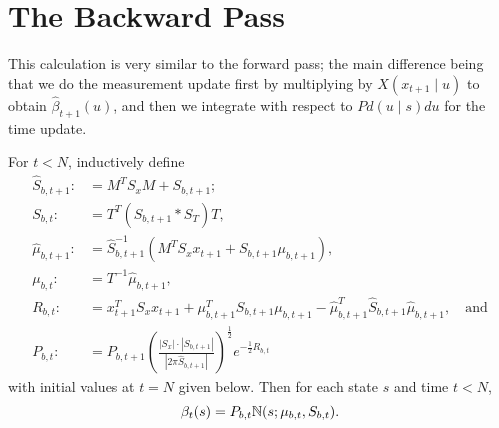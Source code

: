 \documentclass[12pt,leqno]{article}
\begin{document}
\section{The Backward Pass}
This calculation is very similar to the forward pass; the main difference being that we do
the measurement update first by multiplying by $X(x_{t+1}\mid u)$ to obtain $\hat{\beta}_{t+1}(u)$,
and then we integrate with respect to $Pd(u\mid s)du$ for the time update.  

\begin{Thm}\label{beta:1}
  For $t < N$, inductively define
\begin{align*}
  \hat{S}_{b,t+1} :&= M^TS_xM + S_{b,t+1};\\
  S_{b,t} :&= T^T(\hat{S}_{b,t+1}*S_T)T,\\
  \hat{\mu}_{b,t+1} :&= \hat{S}_{b,t+1}^{-1}(M^TS_xx_{t+1} + S_{b,t+1}\mu_{b,t+1}),\\
  \mu_{b,t} :&= T^{-1}\hat{\mu}_{b,t+1},\\
  R_{b,t} :&= x_{t+1}^TS_xx_{t+1} + \mu_{b,t+1}^TS_{b,t+1}\mu_{b,t+1} - \hat{\mu}_{b,t+1}^T\hat{S}_{b,t+1}\hat{\mu}_{b,t+1},\quad\text{and}\\
  P_{b,t} :&= P_{b,t+1}\left(\frac{|S_x|\cdot|S_{b,t+1}|}{|2\pi\hat{S}_{b,t+1}|}\right)^{\frac{1}{2}}e^{-\frac{1}{2}R_{b,t}}
\end{align*}
with initial values at $t = N$ given below. Then for each state $s$ and time $t < N$,
$$
  \beta_t(s) = P_{b,t}{\mathbb N}(s;\mu_{b,t},S_{b,t}).
$$
\end{Thm}
\end{document}
